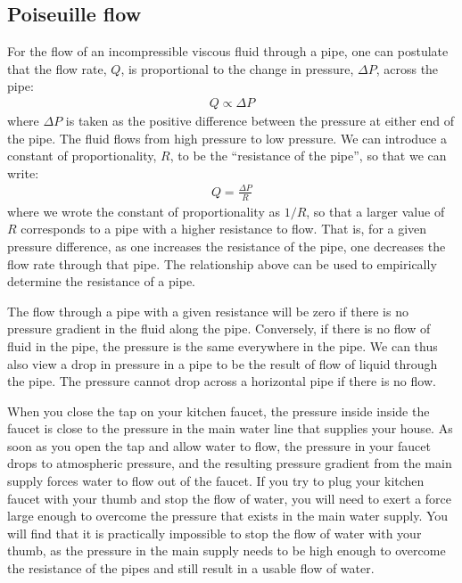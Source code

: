 {{\subsection{Poiseuille flow}
For the flow of an incompressible viscous fluid through a pipe, one can postulate that the flow rate, $Q$, is proportional to the change in pressure, $\Delta P$, across the pipe:
\begin{align*}
Q \propto \Delta P
\end{align*}
where $\Delta P$ is taken as the positive difference between the pressure at either end of the pipe. The fluid flows from high pressure to low pressure. We can introduce a constant of proportionality, $R$, to be the ``resistance of the pipe'', so that we can write:
\begin{align*}
Q = \frac{\Delta P}{R} 
\end{align*}
where we wrote the constant of proportionality as $1/R$, so that a larger value of $R$ corresponds to a pipe with a higher resistance to flow. That is, for a given pressure difference, as one increases the resistance of the pipe, one decreases the flow rate through that pipe. The relationship above can be used to empirically determine the resistance of a pipe.

The flow through a pipe with a given resistance will be zero if there is no pressure gradient in the fluid along the pipe. Conversely, if there is no flow of fluid in the pipe, the pressure is the same everywhere in the pipe. We can thus also view a drop in pressure in a pipe to be the result of flow of liquid through the pipe. The pressure cannot drop across a horizontal pipe if there is no flow.

When you close the tap on your kitchen faucet, the pressure inside inside the faucet is close to the pressure in the main water line that supplies your house. As soon as you open the tap and allow water to flow, the pressure in your faucet drops to atmospheric pressure, and the resulting pressure gradient from the main supply forces water to flow out of the faucet. If you try to plug your kitchen faucet with your thumb and stop the flow of water, you will need to exert a force large enough to overcome the pressure that exists in the main water supply. You will find that it is practically impossible to stop the flow of water with your thumb, as the pressure in the main supply needs to be high enough to overcome the resistance of the pipes and still result in a usable flow of water. 

}}
